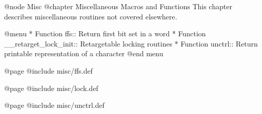 @node Misc
@chapter Miscellaneous Macros and Functions
This chapter describes miscellaneous routines not covered elsewhere.

@menu 
* Function ffs::      Return first bit set in a word
* Function __retarget_lock_init::     Retargetable locking routines
* Function unctrl::   Return printable representation of a character
@end menu

@page
@include misc/ffs.def

@page
@include misc/lock.def

@page
@include misc/unctrl.def
